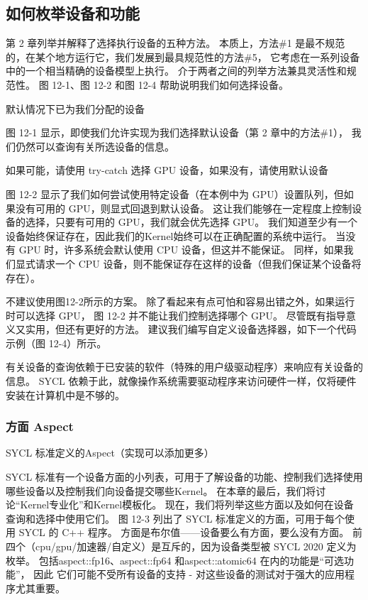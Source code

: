 \subsection{如何枚举设备和功能}
第 2 章列举并解释了选择执行设备的五种方法。 
本质上，方法\#1 是最不规范的，在某个地方运行它，我们发展到最具规范性的方法\#5，
它考虑在一系列设备中的一个相当精确的设备模型上执行。 介于两者之间的列举方法兼具灵活性和规范性。 
图 12-1、图 12-2 和图 12-4 帮助说明我们如何选择设备。

{\color{red} 默认情况下已为我们分配的设备}

图 12-1 显示，即使我们允许实现为我们选择默认设备（第 2 章中的方法\#1），
我们仍然可以查询有关所选设备的信息。

{\color{red} 如果可能，请使用 try-catch 选择 GPU 设备，如果没有，请使用默认设备}

图 12-2 显示了我们如何尝试使用特定设备（在本例中为 GPU）设置队列，但如果没有可用的 GPU，则显式回退到默认设备。 
这让我们能够在一定程度上控制设备的选择，只要有可用的 GPU，我们就会优先选择 GPU。 
我们知道至少有一个设备始终保证存在，因此我们的Kernel始终可以在正确配置的系统中运行。 
当没有 GPU 时，许多系统会默认使用 CPU 设备，但这并不能保证。 
同样，如果我们显式请求一个 CPU 设备，则不能保证存在这样的设备（但我们保证某个设备将存在）。

不建议使用图12-2所示的方案。 除了看起来有点可怕和容易出错之外，如果运行时可以选择 GPU，
图 12-2 并不能让我们控制选择哪个 GPU。 尽管既有指导意义又实用，但还有更好的方法。 
建议我们编写自定义设备选择器，如下一个代码示例（图 12-4）所示。

有关设备的查询依赖于已安装的软件（特殊的用户级驱动程序）来响应有关设备的信息。 
SYCL 依赖于此，就像操作系统需要驱动程序来访问硬件一样，仅将硬件安装在计算机中是不够的。

\subsubsection{方面 Aspect}
{\color{red} SYCL 标准定义的Aspect（实现可以添加更多）}

SYCL 标准有一个设备方面的小列表，可用于了解设备的功能、控制我们选择使用哪些设备以及控制我们向设备提交哪些Kernel。 
在本章的最后，我们将讨论“Kernel专业化”和Kernel模板化。 现在，我们将列举这些方面以及如何在设备查询和选择中使用它们。 
图 12-3 列出了 SYCL 标准定义的方面，可用于每个使用 SYCL 的 C++ 程序。 
方面是布尔值——设备要么有方面，要么没有方面。 
前四个（cpu/gpu/加速器/自定义）是互斥的，因为设备类型被 SYCL 2020 定义为枚举。
包括aspect::fp16、aspect::fp64 和aspect::atomic64 在内的功能是“可选功能”，
因此 它们可能不受所有设备的支持 - 对这些设备的测试对于强大的应用程序尤其重要。


